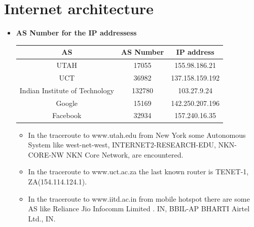 \documentclass{article}
\begin{document}
\section*{Internet architecture}
\begin{itemize}
    \item \textbf{AS Number for the IP addressess} 
    \begin{center}
\begin{tabular}{|c|c|c|}
    \hline
     AS  & AS Number & IP address  \\
    \hline
    UTAH & 17055 &  155.98.186.21 \\
    \hline
   UCT & 36982 & 137.158.159.192\\
    \hline
    Indian Institute of Technology & 132780  & 103.27.9.24 \\
    \hline 
    Google  &   15169   & 142.250.207.196 \\ 
    \hline
    Facebook & 32934   & 157.240.16.35 \\  
    \hline
    \end{tabular}
\end{center}
    \begin{itemize}
        \item In the  traceroute to www.utah.edu from New York some Autonomous System like west-net-west, INTERNET2-RESEARCH-EDU, NKN-CORE-NW NKN Core Network, are encountered.
        \item In the traceroute to www.uct.ac.za the last known router is TENET-1, ZA(154.114.124.1).
        \item In the traceroute to www.iitd.ac.in from mobile hotspot there are some AS like Reliance Jio Infocomm Limited . IN, BBIL-AP BHARTI Airtel Ltd., IN. 
    \end{itemize}
\end{itemize}
\end{document}
